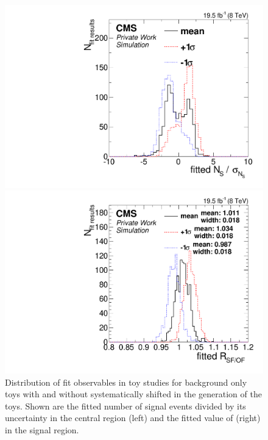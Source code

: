 \begin{figure}[thbp]
  \centering
  \begin{minipage}[t]{0.49\textwidth}
    \includegraphics[width=\textwidth]{plots/results/fit/toyResults/nS_systShift.pdf}
  \end{minipage}
  \begin{minipage}[t]{0.49\textwidth}
    \includegraphics[width=\textwidth]{plots/results/fit/toyResults/rSFOF_systShift.pdf}
  \end{minipage}

  \caption{Distribution of fit observables in toy studies for background only toys with and without systematically shifted \Rsfof in the generation of the toys. Shown are the fitted number of signal events divided by its uncertainty in the central region (left) and the fitted value of \Rsfof (right) in the signal region.}
  \label{fig:toys:systShift}
\end{figure}
\newpage
